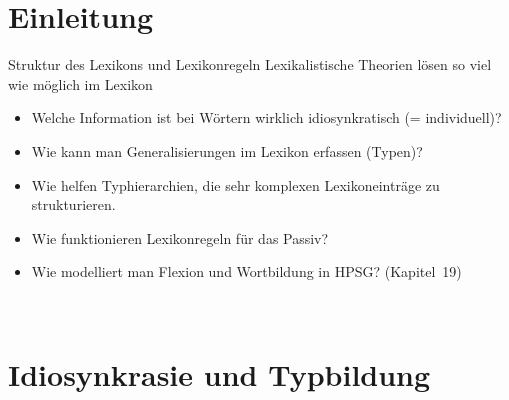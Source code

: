 \section{Einleitung}

\begin{frame}
  {Struktur des Lexikons und Lexikonregeln}
  \onslide<+->
  \onslide<+->
  Lexikalistische Theorien lösen so viel wie möglich im Lexikon\\
  \Zeile
  \begin{itemize}[<+->]
    \item Welche Information ist bei Wörtern wirklich idiosynkratisch (= individuell)?
    \item Wie kann man Generalisierungen im Lexikon erfassen (Typen)?
    \item Wie helfen Typhierarchien, die sehr komplexen Lexikoneinträge zu strukturieren.
      \Halbzeile
    \item Wie funktionieren Lexikonregeln für das Passiv?
    \item Wie modelliert man Flexion und Wortbildung in HPSG? (Kapitel~19)
  \end{itemize}
  \Zeile
  \onslide<+->
  \centering 
  \\
\end{frame}

\section{Idiosynkrasie und Typbildung}

